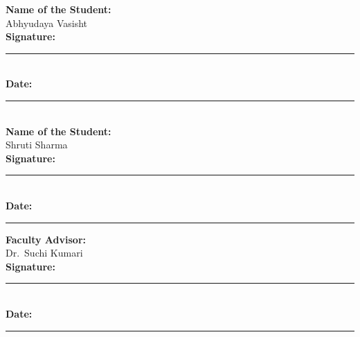 \vspace{2cm}
\noindent
\begin{minipage}[t]{0.48\textwidth}
\textbf{Name of the Student:}\\[0.3em]
Abhyudaya Vasisht\\[1.2cm]
\textbf{Signature:} \rule{4cm}{0.4pt}\\[0.6cm]
\textbf{Date:} \rule{4cm}{0.4pt}\\[1cm]
\textbf{Name of the Student:}\\[0.3em]
Shruti Sharma\\[1.2cm]
\textbf{Signature:} \rule{4cm}{0.4pt}\\[0.6cm]
\textbf{Date:} \rule{4cm}{0.4pt}
\end{minipage}\hfill
\begin{minipage}[t]{0.48\textwidth}
\textbf{Faculty Advisor:}\\[0.3em]
Dr.\ Suchi Kumari\\[1.2cm]
\textbf{Signature:} \rule{4cm}{0.4pt}\\[0.6cm]
\textbf{Date:} \rule{4cm}{0.4pt}
\end{minipage}
